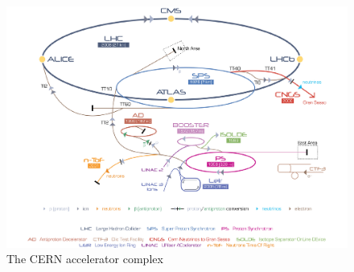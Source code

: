 \begin{figure}[htbp]
\begin{center}
\includegraphics[width=12.cm]{./Version1/FigChapter4/FigureLHC}
\caption{ The CERN accelerator complex \cite{cite:LHCfig}}
\label{fig:lhc}
\end{center}
\end{figure}

